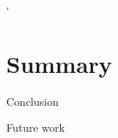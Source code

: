 `%

\section{Summary}
\frame{\sectionpage}

\begin{frame}{Conclusion}
\end{frame}{}

\begin{frame}{Future work}
\end{frame}{}
